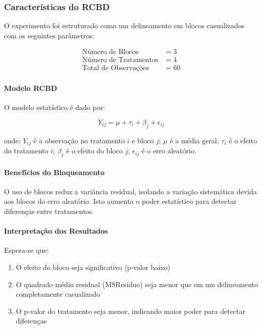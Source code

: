 \subsubsection{Características do RCBD}

O experimento foi estruturado como um delineamento em blocos casualizados com os seguintes parâmetros:

\begin{align*}
\text{Número de Blocos} &= 3 \\
\text{Número de Tratamentos} &= 4 \\
\text{Total de Observações} &= 60
\end{align*}

\paragraph{Modelo RCBD}
O modelo estatístico é dado por:

\[Y_{ij} = \mu + \tau_i + \beta_j + \epsilon_{ij}\]

onde: $Y_{ij}$ é a observação no tratamento $i$ e bloco $j$; $\mu$ é a média geral; $\tau_i$ é o efeito do tratamento $i$; $\beta_j$ é o efeito do bloco $j$; $\epsilon_{ij}$ é o erro aleatório.

\paragraph{Benefícios do Bloqueamento}
O uso de blocos reduz a variância residual, isolando a variação sistemática devida aos blocos do erro aleatório. Isto aumenta o poder estatístico para detectar diferenças entre tratamentos.

\paragraph{Interpretação dos Resultados}
Espera-se que:

\begin{enumerate}
\item O efeito do bloco seja significativo (p-valor baixo)
\item O quadrado médio residual (MSResíduo) seja menor que em um delineamento completamente casualizado
\item O p-valor do tratamento seja menor, indicando maior poder para detectar diferenças
\end{enumerate}

